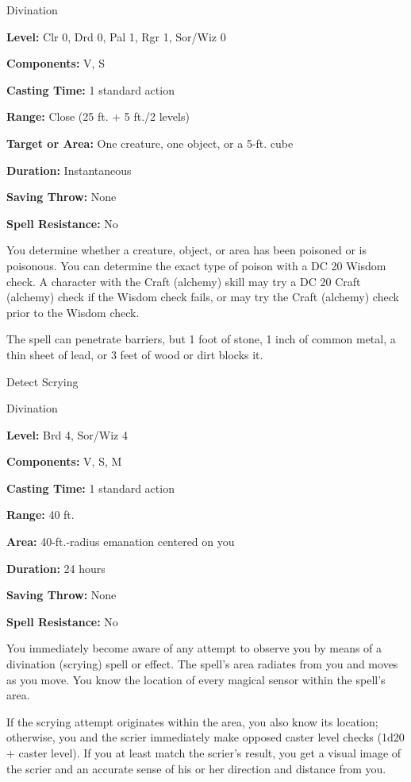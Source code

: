 \documentclass{article}
\begin{document}
Divination

\textbf{Level:} Clr 0, Drd 0, Pal 1, Rgr 1, Sor/Wiz 0

\textbf{Components:} V, S

\textbf{Casting Time:} 1 standard action

\textbf{Range:} Close (25 ft. + 5 ft./2 levels)

\textbf{Target or Area:} One creature, one object, or a 5-ft. cube

\textbf{Duration:} Instantaneous

\textbf{Saving Throw:} None

\textbf{Spell Resistance:} No

You determine whether a creature, object, or area has been poisoned or is poisonous. 
You can determine the exact type of poison with a DC 20 Wisdom check. A character 
with the Craft (alchemy) skill may try a DC 20 Craft (alchemy) check if the Wisdom 
check fails, or may try the Craft (alchemy) check prior to the Wisdom check.

The spell can penetrate barriers, but 1 foot of stone, 1 inch of common metal, 
a thin sheet of lead, or 3 feet of wood or dirt blocks it.

\vspace{12pt}
Detect Scrying

Divination

\textbf{Level:} Brd 4, Sor/Wiz 4

\textbf{Components:} V, S, M

\textbf{Casting Time:} 1 standard action

\textbf{Range:} 40 ft.

\textbf{Area:} 40-ft.-radius emanation centered on you

\textbf{Duration:} 24 hours

\textbf{Saving Throw:} None

\textbf{Spell Resistance:} No

You immediately become aware of any attempt to observe you by means of a divination 
(scrying) spell or effect. The spell's area radiates from you and moves as you 
move. You know the location of every magical sensor within the spell's area.

If the scrying attempt originates within the area, you also know its location; 
otherwise, you and the scrier immediately make opposed caster level checks (1d20 
+ caster level). If you at least match the scrier's result, you get a visual image 
of the scrier and an accurate sense of his or her direction and distance from you.
\end{document}
